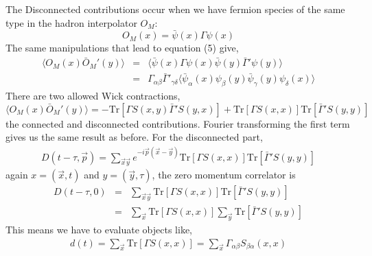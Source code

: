 \documentclass[3p,preprint]{elsarticle}
\begin{document}
The Disconnected contributions occur when we have fermion species of the same type in the hadron interpolator $O_M$:
\begin{equation}
O_M(x) = \bar{ \psi } (x) \Gamma \psi(x)
\end{equation}
The same manipulations that lead to equation (5) give,
\begin{eqnarray}
\langle O_M(x) \bar{O}_M'(y) \rangle &=& \langle \bar{\psi}(x) \Gamma \psi(x) \bar{\psi}(y) \bar{ \Gamma }' \psi(y) \rangle \\ 
&=& \Gamma_{\alpha \beta} \bar{ \Gamma }'_{\gamma \delta} \langle \bar{\psi}_\alpha(x)  \psi_\beta(y) \bar{\psi}_\gamma(y)  \psi_\delta(x) \rangle 
\end{eqnarray}
There are two allowed Wick contractions,
\begin{equation}
\langle O_M(x) \bar{O}_M'(y) \rangle = -\text{Tr}\left[ \Gamma S (x,y) \bar{ \Gamma }' S (y,x) \right] + \text{Tr}\left[ \Gamma S (x,x) \right] \text{Tr} \left[ \bar{ \Gamma }' S (y,y) \right]
\end{equation}
the connected and disconnected contributions. Fourier transforming the first term gives us the same result as before. For the disconnected
part,
\begin{eqnarray}
D(t - \tau, \vec{p}) = \sum_{\vec{x} \vec{y}} e^{-i \vec{p} (\vec{x} - \vec{y} )} \text{Tr}\left[ \Gamma S (x,x) \right] \text{Tr} \left[ \bar{ \Gamma }' S (y,y) \right]
\end{eqnarray}
again $x = (\vec{x}, t)$ and $y = (\vec{y}, \tau)$, the zero momentum correlator is
\begin{eqnarray}
D(t - \tau, 0) &=& \sum_{\vec{x} \vec{y}} \text{Tr}\left[ \Gamma S (x,x) \right] \text{Tr} \left[ \bar{ \Gamma }' S (y,y) \right] \\
 &=& \sum_{\vec{x}} \text{Tr}\left[ \Gamma S (x,x) \right] \sum_{\vec{y}} \text{Tr} \left[ \bar{ \Gamma }' S (y,y) \right] 
\end{eqnarray}
This means we have to evaluate objects like,
\begin{eqnarray}
d(t) = \sum_{\vec{x}} \text{Tr}\left[ \Gamma S (x,x) \right] = \sum_{\vec{x}} \Gamma_{\alpha \beta} S_{\beta \alpha}(x,x)
\end{eqnarray}
\end{document}
